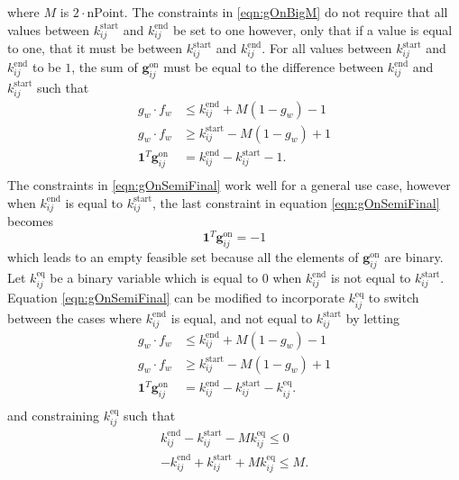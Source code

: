 where $M$ is $2\cdot\text{nPoint}$. The constraints in \eqref{eqn:gOnBigM} do not require that all values between $k_{ij}^{\text{start}}$ and $k_{ij}^{\text{end}}$ be set to one however, only that if a value is equal to one, that it must be between $k_{ij}^{\text{start}}$ and $k_{ij}^{\text{end}}$. For all values between  $k_{ij}^{\text{start}}$ and $k_{ij}^{\text{end}}$ to be $1$, the sum of $\mathbf{g}_{ij}^{\text{on}}$ must be equal to the difference between $k_{ij}^{\text{end}}$ and $k_{ij}^{\text{start}}$ such that 
\begin{equation} \label{eqn:gOnSemiFinal}\begin{aligned}
	g_w\cdot f_w &\le k^{\text{end}}_{ij} + M(1 - g_w) - 1 \\
	g_w\cdot f_w &\ge k^{\text{start}}_{ij} - M(1 - g_w) + 1 \\ 
	\mathbf{1}^T\mathbf{g}_{ij}^{\text{on}} &= k_{ij}^{\text{end}} - k_{ij}^{\text{start}} - 1.\\
\end{aligned} \end{equation}
The constraints in \eqref{eqn:gOnSemiFinal} work well for a general use case, however when $k_{ij}^{\text{end}}$ is equal to $k_{ij}^{\text{start}}$, the last constraint in equation \ref{eqn:gOnSemiFinal} becomes
\begin{equation}
	\mathbf{1}^T\mathbf{g}_{ij}^{\text{on}} = -1
\end{equation}
which leads to an empty feasible set because all the elements of $\mathbf{g}_{ij}^{\text{on}}$ are binary. Let $k_{ij}^{\text{eq}}$ be a binary variable which is equal to $0$ when $k_{ij}^{\text{end}}$ is not equal to $k_{ij}^{\text{start}}$. Equation \eqref{eqn:gOnSemiFinal} can be modified to incorporate $k_{ij}^{\text{eq}}$ to switch between the cases where $k_{ij}^{\text{end}}$ is equal, and not equal to $k_{ij}^{\text{start}}$ by letting 
\begin{equation} \label{eqn:gOnFinal}\begin{aligned}
	g_w\cdot f_w &\le k^{\text{end}}_{ij} + M(1 - g_w) - 1 \\
	g_w\cdot f_w &\ge k^{\text{start}}_{ij} - M(1 - g_w) + 1 \\ 
	\mathbf{1}^T\mathbf{g}_{ij}^{\text{on}} &= k_{ij}^{\text{end}} - k_{ij}^{\text{start}} - k_{ij}^{\text{eq}}.\\
\end{aligned} \end{equation} 
 and constraining $k_{ij}^{\text{eq}}$ such that 
\begin{equation}\label{eqn:kEq}\begin{aligned}
	k_{ij}^{\text{end}} - k_{ij}^{\text{start}} - M k_{ij}^{\text{eq}} \le 0 \\
	-k_{ij}^{\text{end}} + k_{ij}^{\text{start}} + M k_{ij}^{\text{eq}} \le M .
\end{aligned}\end{equation}
